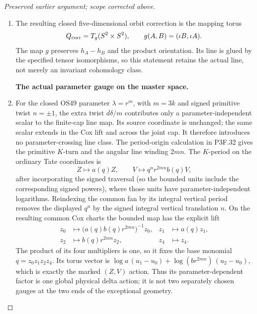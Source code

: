 \begin{proof}[Preserved earlier argument; scope corrected above]
\begin{enumerate}[label=\arabic*.]
\item The resulting closed five-dimensional orbit correction is the
mapping torus
\[
 Q_{\rm corr}=T_g(S^2\times S^2),\qquad
           g(A,B)=(\iota B,\iota A).
\]
The map \(g\) preserves \(h_A-h_B\) and the product
orientation.  Its line is glued by the specified tensor
isomorphisms, so this statement retains the actual line,
not merely an invariant cohomology class.

\par\medskip\noindent\textbf{The actual parameter gauge on the master space.}\enspace

\item For the closed OS49 parameter \(\lambda=r^m\), with
\(m=3k\) and signed primitive twist \(n=\pm1\), the
extra twist \(d\delta/m\) contributes only a parameter-independent
scalar to the finite-cap line map.  Its source coordinate is unchanged;
the same scalar extends in the Cox lift and across the joint cap.
It therefore introduces no parameter-crossing line class.  The
period-origin calculation in P3F.32 gives the primitive
\(K\)-turn and the angular line winding \(2mn\).
The \(K\)-period on the ordinary Tate coordinates is
\[
      Z\longmapsto a(q)Z,\qquad
      V\longmapsto q^n r^{2mn}b(q)V,
\]
after incorporating the signed traversal (so the bounded units
include the corresponding signed powers), where those units
have parameter-independent logarithms.  Reindexing
the common fan by its integral vertical period removes the
displayed \(q^n\) by the signed integral vertical translation
\(n\).  On the resulting common Cox charts the
bounded map has the explicit lift
\[
 \begin{aligned}
 z_0&\longmapsto\bigl(a(q)b(q)r^{2mn}\bigr)^{-1}z_0,
       &z_1&\longmapsto a(q)z_1,\\
 z_2&\longmapsto b(q)r^{2mn}z_2,
       &z_4&\longmapsto z_4.
 \end{aligned}                                      \tag{P3K.17.3}
\]
The product of its four multipliers is one, so it fixes the
base monomial \(q=z_0z_1z_2z_4\).  Its torus vector is
\(\log a\,(u_1-u_0)+\log(br^{2mn})\,(u_2-u_0)\),
which is exactly the marked \((Z,V)\) action.  Thus its
parameter-dependent factor is one global physical delta
action; it is not two separately chosen gauges at the two
ends of the exceptional geometry.


\end{enumerate}
\end{proof}
